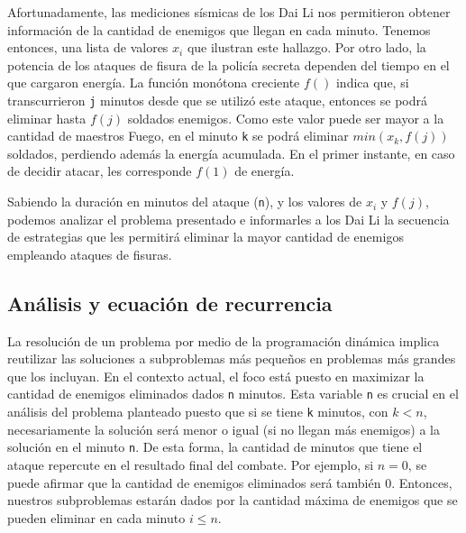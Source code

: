 \documentclass{article}
\begin{document}
Afortunadamente, las mediciones sísmicas de los Dai Li nos permitieron obtener información de la cantidad de enemigos que llegan en cada minuto. Tenemos entonces, una lista de valores $x_i$ que ilustran este hallazgo. Por otro lado, la potencia de los ataques de fisura de la policía secreta dependen del tiempo en el que cargaron energía. La función monótona creciente $f()$ indica que, si transcurrieron \texttt{j} minutos desde que se utilizó este ataque, entonces se podrá eliminar hasta  $f(j)$ soldados enemigos. Como este valor puede ser mayor a la cantidad de maestros Fuego, en el minuto \texttt{k} se podrá eliminar $min(x_k, f(j))$ soldados, perdiendo además la energía acumulada. En el primer instante, en caso de decidir atacar, les corresponde $f(1)$ de energía.

Sabiendo la duración en minutos del ataque (\texttt{n}), y los valores de $x_i$ y $f(j)$, podemos analizar el problema presentado e informarles a los Dai Li la secuencia de estrategias que les permitirá eliminar la mayor cantidad de enemigos empleando ataques de fisuras.

\subsection{Análisis y ecuación de recurrencia}

La resolución de un problema por medio de la programación dinámica implica reutilizar las soluciones a subproblemas más pequeños en problemas más grandes que los incluyan. En el contexto actual, el foco está puesto en maximizar la cantidad de enemigos eliminados dados \texttt{n} minutos. Esta variable \texttt{n} es crucial en el análisis del problema planteado puesto que si se tiene \texttt{k} minutos, con $k < n$, necesariamente la solución será menor o igual (si no llegan más enemigos) a la solución en el minuto \texttt{n}. De esta forma, la cantidad de minutos que tiene el ataque repercute en el resultado final del combate. Por ejemplo, si $n = 0$, se puede afirmar que la cantidad de enemigos eliminados será también 0. Entonces, nuestros subproblemas estarán dados por la cantidad máxima de enemigos que se pueden eliminar en cada minuto $i \leq n$.
\end{document}
